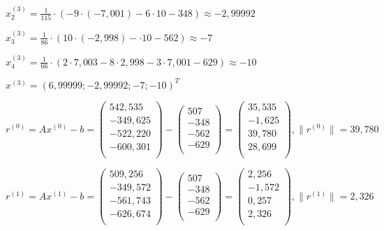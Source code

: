 \documentclass[a4paper,12pt]{article} %
\begin{document}
\begin{enumerate}
$x_2^{(3)} = \frac{1}{115} \cdot (-9 \cdot (-7,001) - 6 \cdot 10 - 348) \approx -2,99992$

$x_3^{(3)} = \frac{1}{86} \cdot (10 \cdot (-2,998) - \cdot 10 - 562) \approx -7$

$x_4^{(3)} = \frac{1}{66} \cdot (2 \cdot 7,003 - 8 \cdot 2,998 - 3 \cdot 7,001 - 629) \approx -10$

$x^{(3)} = (6,99999; -2,99992; -7; -10)^T$

\newpage

\begin{equation*}
    r^{(0)} = Ax^{(0)} - b =
    \begin{pmatrix}
        542,535 \\
        -349,625 \\
        -522,220 \\
        -600,301 \\
    \end{pmatrix}
    -
    \begin{pmatrix}
        507 \\
        -348 \\
        -562 \\
        -629 \\
    \end{pmatrix}
    =
    \begin{pmatrix}
        35,535 \\
        -1,625 \\
        39,780 \\
        28,699 \\
    \end{pmatrix}
    , \|r^{(0)}\| = 39,780
\end{equation*}

\begin{equation*}
    r^{(1)} = Ax^{(1)} - b =
    \begin{pmatrix}
        509,256 \\
        -349,572 \\
        -561,743 \\
        -626,674 \\
    \end{pmatrix}
    -
    \begin{pmatrix}
        507 \\
        -348 \\
        -562 \\
        -629 \\
    \end{pmatrix}
    =
    \begin{pmatrix}
        2,256 \\
        -1,572 \\
        0,257 \\
        2,326 \\
    \end{pmatrix}
    , \|r^{(1)}\| = 2,326
\end{equation*}


\end{enumerate}
\end{document}
